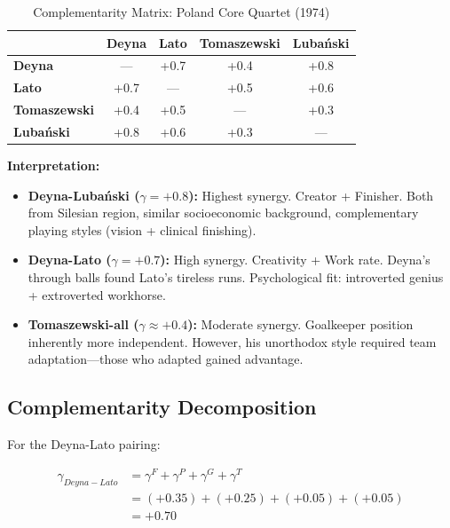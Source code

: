 \begin{table}[h]
\centering
\caption{Complementarity Matrix: Poland Core Quartet (1974)}
\label{tab:poland-gamma}
\begin{tabular}{lcccc}
\toprule
 & \textbf{Deyna} & \textbf{Lato} & \textbf{Tomaszewski} & \textbf{Lubański} \\
\midrule
\textbf{Deyna} & — & +0.7 & +0.4 & +0.8 \\
\textbf{Lato} & +0.7 & — & +0.5 & +0.6 \\
\textbf{Tomaszewski} & +0.4 & +0.5 & — & +0.3 \\
\textbf{Lubański} & +0.8 & +0.6 & +0.3 & — \\
\bottomrule
\end{tabular}
\end{table}

\textbf{Interpretation:}
\begin{itemize}
    \item \textbf{Deyna-Lubański ($\gamma = +0.8$):} Highest synergy. Creator + Finisher.
    Both from Silesian region, similar socioeconomic background, complementary
    playing styles (vision + clinical finishing).

    \item \textbf{Deyna-Lato ($\gamma = +0.7$):} High synergy. Creativity + Work rate.
    Deyna's through balls found Lato's tireless runs. Psychological fit:
    introverted genius + extroverted workhorse.

    \item \textbf{Tomaszewski-all ($\gamma \approx +0.4$):} Moderate synergy.
    Goalkeeper position inherently more independent. However, his
    unorthodox style required team adaptation—those who adapted gained advantage.
\end{itemize}

\subsection{Complementarity Decomposition}

For the Deyna-Lato pairing:

\begin{align}
\gamma_{Deyna-Lato} &= \gamma^{F} + \gamma^{P} + \gamma^{G} + \gamma^{T} \\
&= (+0.35) + (+0.25) + (+0.05) + (+0.05) \\
&= +0.70
\end{align}

